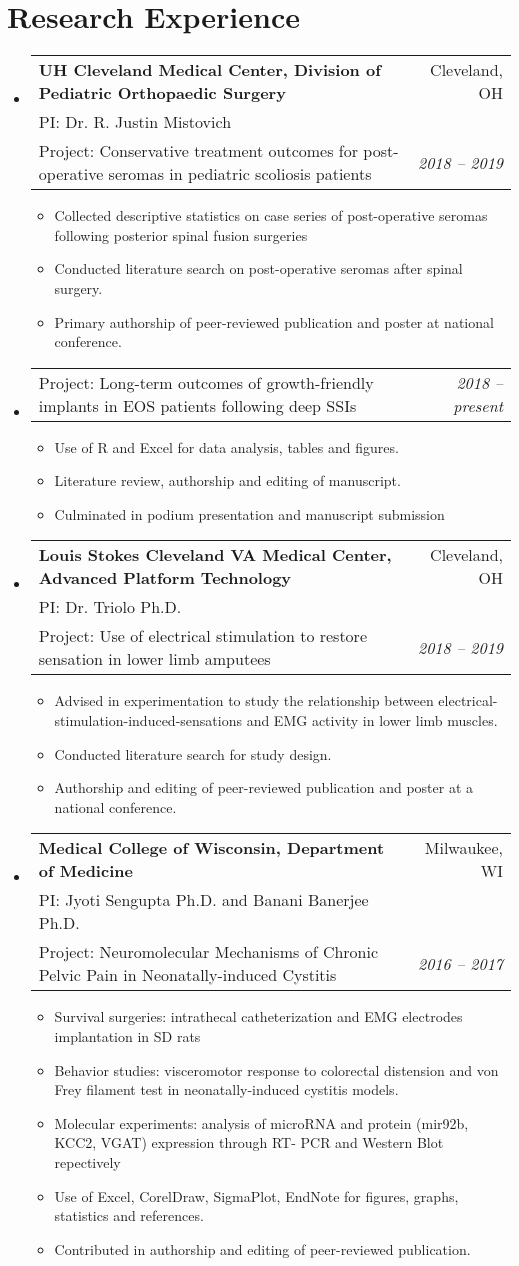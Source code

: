 \documentclass[letterpaper,11pt]{article}
\makeatletter
\newcommand{\cvResearchSubheading}[5]{
  \vspace{-2pt}\item
    \begin{tabular*}{0.97\textwidth}[t]{l@{\extracolsep{\fill}}r}
      \textbf{#1} & #2 \\
      \small#3 \\
      \small #4 & \textit{\small #5} \\
    \end{tabular*}\vspace{-7pt}
}
\newcommand{\cvResearchSubSubheading}[2]{
    \vspace{-6pt}\item
    \begin{tabular*}{0.97\textwidth}{l@{\extracolsep{\fill}}r}
      \small#1 & \textit{\small #2} \\
    \end{tabular*}\vspace{-7pt}
}
\newcommand{\cvItem}[1]{
  \item\small{
    {#1 \vspace{-2pt}}
  }
}
\newcommand{\cvSubHeadingListStart}{\begin{itemize}[leftmargin=0.15in, label={}]}
\newcommand{\cvSubHeadingListEnd}{\end{itemize}}
\newcommand{\cvItemListStart}{\begin{itemize}}
\newcommand{\cvItemListEnd}{\vspace{-5pt}\end{itemize}}
\makeatother
\begin{document}
\section{Research Experience}
  \cvSubHeadingListStart
    \cvResearchSubheading
      {UH Cleveland Medical Center, Division of Pediatric Orthopaedic Surgery}{Cleveland, OH}
      {PI: Dr. R. Justin Mistovich}
      {Project: Conservative treatment outcomes for post-operative seromas in pediatric scoliosis patients}{2018 -- 2019}
      \cvItemListStart
        \cvItem{Collected descriptive statistics on case series of post-operative seromas following posterior spinal fusion surgeries}
        \cvItem{Conducted literature search on post-operative seromas after spinal surgery.}
        \cvItem{Primary authorship of peer-reviewed publication and poster at national conference.}
      \cvItemListEnd
    \cvResearchSubSubheading
      {Project: Long-term outcomes of growth-friendly implants in EOS patients following deep SSIs}{2018 -- present}
      \cvItemListStart
        \cvItem{Use of R and Excel for data analysis, tables and figures.}
        \cvItem{Literature review, authorship and editing of manuscript.}
        \cvItem{Culminated in podium presentation and manuscript submission}
      \cvItemListEnd

    \cvResearchSubheading
      {Louis Stokes Cleveland VA Medical Center, Advanced Platform Technology}{Cleveland, OH}
      {PI: Dr. Triolo Ph.D.}
      {Project: Use of electrical stimulation to restore sensation in lower limb amputees}{2018 -- 2019}
      \cvItemListStart
        \cvItem{Advised in experimentation to study the relationship between electrical-stimulation-induced-sensations and EMG activity in lower limb muscles.}
        \cvItem{Conducted literature search for study design.}
        \cvItem{Authorship and editing of peer-reviewed publication and poster at a national conference.}
      \cvItemListEnd
    \cvResearchSubheading
      {Medical College of Wisconsin, Department of Medicine}{Milwaukee, WI}
      {PI: Jyoti Sengupta Ph.D. and Banani Banerjee Ph.D.}
      {Project: Neuromolecular Mechanisms of Chronic Pelvic Pain in Neonatally-induced Cystitis}{2016 -- 2017}
      \cvItemListStart
        \cvItem{Survival surgeries: intrathecal catheterization and EMG electrodes implantation in SD rats}
        \cvItem{Behavior studies: visceromotor response to colorectal distension and von Frey filament test in neonatally-induced cystitis models.}
        \cvItem{Molecular experiments: analysis of microRNA and protein (mir92b, KCC2, VGAT) expression through RT- PCR and Western Blot repectively}
        \cvItem{Use of Excel, CorelDraw, SigmaPlot, EndNote for figures, graphs, statistics and references.}
        \cvItem{Contributed in authorship and editing of peer-reviewed publication.}
      \cvItemListEnd
  \cvSubHeadingListEnd
\end{document}
